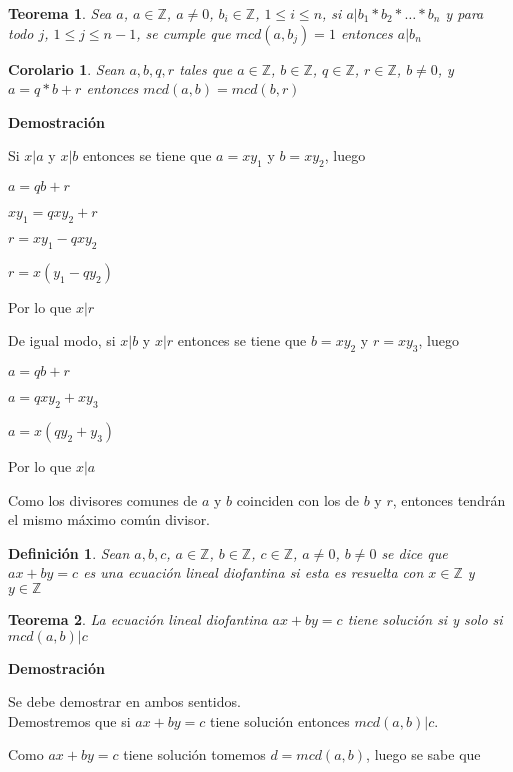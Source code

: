 \documentclass[a4paper,1pt]{report}
\newtheorem*{teo}{Teorema}
\newtheorem*{cor}{Corolario}
\newtheorem*{dfn}{Definición}
\begin{document}
\begin{teo}
 Sea $a$, $a\in\mathbb{Z}$, $a\neq 0$, $b_i\in\mathbb{Z}$, $1\leq i \leq n$, si $a|b_1*b_2*\dots *b_n$ y para  todo $j$, $1\leq j \leq n-1$, se cumple que $mcd(a,b_j)=1$ entonces $a|b_n$
\end{teo}

\begin{cor}
 Sean $a,b,q,r$ tales que $a\in\mathbb{Z}$, $b\in\mathbb{Z}$, $q\in\mathbb{Z}$, $r\in\mathbb{Z}$, $b\neq 0$, y $a=q*b+r$ entonces $mcd(a,b)=mcd(b,r)$
\end{cor}

\textbf{Demostración}



Si $x|a$ y $x|b$ entonces se tiene que $a=xy_1$ y $b=xy_2$, luego 

$a=qb+r$

$xy_1 = qxy_2 + r$

$r = xy_1 - qxy_2$

$r = x(y_1-qy_2)$

Por lo que $x|r$

De igual modo, si $x|b$ y $x|r$ entonces se tiene que $b=xy_2$ y $r=xy_3$, luego

$a=qb+r$

$a=qxy_2+xy_3$

$a=x(qy_2+y_3)$

Por lo que $x|a$

Como los divisores comunes de $a$ y $b$ coinciden con los de $b$ y $r$, entonces tendrán el mismo máximo común divisor.

\begin{dfn}
 Sean $a,b,c$, $a\in\mathbb{Z}$, $b\in\mathbb{Z}$, $c\in\mathbb{Z}$, $a\neq 0$, $b\neq 0$ se dice que $ax+by=c$ es una ecuación lineal diofantina si esta es resuelta con $x\in\mathbb{Z}$ y $y\in\mathbb{Z}$
\end{dfn}

\begin{teo}
 La ecuación lineal diofantina $ax+by=c$ tiene solución si y solo si $mcd(a,b)|c$
\end{teo}

\textbf{Demostración}

Se debe demostrar en ambos sentidos.
\\

Demostremos que si $ax+by=c$ tiene solución entonces $mcd(a,b)|c$.

Como $ax+by=c$ tiene solución tomemos $d=mcd(a,b)$, luego se sabe que
\end{document}
